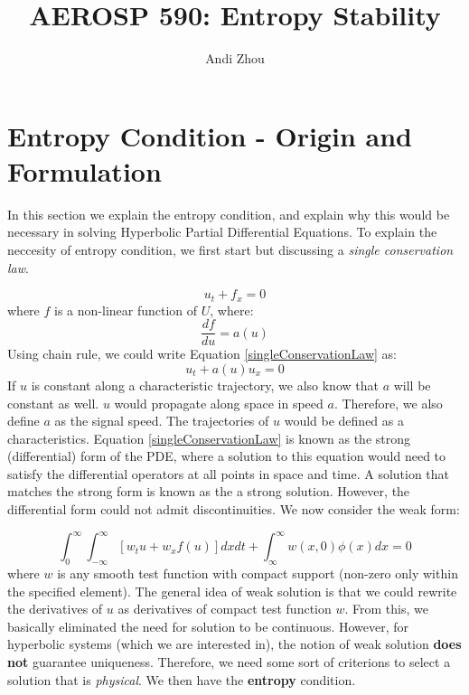 \documentclass[a4paper]{article}
\title{AEROSP 590: Entropy Stability}
\author{Andi Zhou}
\numberwithin{equation}{section}
\begin{document}
\maketitle

\section{Entropy Condition - Origin and Formulation}
In this section we explain the entropy condition, and explain why this would be necessary in solving Hyperbolic Partial Differential Equations. To explain the neccesity of entropy condition, we first start but discussing a \textit{single conservation law}.

\begin{equation} \label{singleConservationLaw}
    u_t + f_x = 0
\end{equation}
where $f$ is a non-linear function of $U$, where:
\begin{equation}
    \frac{df}{du} = a(u)
\end{equation}
Using chain rule, we could write Equation \ref{singleConservationLaw} as:
\begin{equation}
    u_t + a(u)u_x = 0
\end{equation}
If $u$ is constant along a characteristic trajectory, we also know that $a$ will be constant as well. $u$ would propagate along space in speed $a$. Therefore, we also define $a$ as the signal speed. The trajectories of $u$ would be defined as a characteristics. Equation \ref{singleConservationLaw} is known as the strong (differential) form of the PDE, where a solution to this equation would need to satisfy the differential operators at all points in space and time. A solution that matches the strong form is known as the a strong solution. However, the differential form could not admit discontinuities. We now consider the weak form:

\begin{equation}
    \int_{0}^{\infty} \int_{-\infty}^{\infty} \left[w_t u + w_x f(u) \right] dx dt + \int_{\infty}^\infty w(x,0) \phi(x) dx = 0
\end{equation}
where $w$ is any smooth test function with compact support (non-zero only within the specified element). The general idea of weak solution is that we could rewrite the derivatives of $u$ as derivatives of compact test function $w$. From this, we basically eliminated the need for solution to be continuous. However, for hyperbolic systems (which we are interested in), the notion of weak solution \textbf{does not} guarantee uniqueness. Therefore, we need some sort of criterions to select a solution that is \textit{physical}. We then have the \textbf{entropy} condition. 
\end{document}
